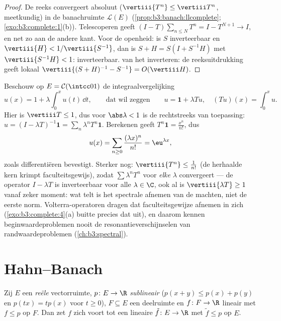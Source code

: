 \begin{proof}
De reeks convergeert absoluut ($\vertiii{T^n} \leq \vertiii T^n$,
meetkundig) in de banachruimte $\mathcal L(E)$
(\cref{prop:b3:banach:llcomplete};
\cref{exo:b3:complete:1}(b)). Telescoperen geeft $(I -
T)\sum_{n \leq N}T^n = I - T^{N+1} \to I$, en net zo aan de andere
kant. Voor de openheid: is $S$ inverteerbaar en $\vertiii{H} <
1/\vertiii{S^{-1}}$, dan is $S + H = S(I + S^{-1}H)$ met
$\vertiii{S^{-1}H} < 1$: inverteerbaar.  van het
inverteren: de reeksuitdrukking geeft lokaal
$\vertiii{(S+H)^{-1} - S^{-1}} = O(\vertiii H)$.
\end{proof}

\begin{example}
\label{ex:b3:banach:volterraexample}
Beschouw op $E = \mathcal C(\intcc01)$ de integraalvergelijking
\[
u(x) = 1 + \lambda\int_0^xu(t)\,\dd t,
\qquad\text{dat wil zeggen}\qquad u = \mathbf 1 + \lambda Tu,
\quad (Tu)(x) = \int_0^xu .
\]
Hier is $\vertiii T \leq 1$, dus voor $\abs\lambda < 1$ is de
 rechtstreeks van toepassing: $u = (I - \lambda
T)^{-1}\mathbf 1 = \sum_n\lambda^nT^n\mathbf 1$. Berekenen geeft
$T^n\mathbf 1 = \frac{x^n}{n!}$, dus
\[
u(x) = \sum_{n\geq0}\frac{(\lambda x)^n}{n!} =
\eu^{\lambda x} ,
\]
zoals differentiëren bevestigt. Sterker nog: $\vertiii{T^n} \leq
\frac1{n!}$ (de herhaalde kern krimpt faculteitsgewijs), zodat
$\sum\lambda^nT^n$ voor \emph{elke} $\lambda$ convergeert --- de
operator $I - \lambda T$ is inverteerbaar voor alle $\lambda \in
\C$, ook al is $\vertiii{\lambda T} \geq 1$ vanaf zeker moment:
wat telt is het spectrale afnemen van de machten, niet de eerste
norm. Volterra-operatoren dragen dat faculteitsgewijze afnemen in
zich (\cref{exo:b3:complete:4}(a) buitte precies dat uit), en
daarom kennen beginwaardeproblemen nooit de
resonantieverschijnselen van randwaardeproblemen
(\cref{ch:b3:spectral}).
\end{example}

\section{Hahn--Banach}

\begin{theorem}
\label{thm:b3:banach:hahnbanach}
Zij $E$ een \emph{reële} vectorruimte, $p \colon E \to \R$
\emph{sublineair} ($p(x + y) \leq p(x) + p(y)$ en $p(tx) = tp(x)$
voor $t \geq 0$), $F \subseteq E$ een deelruimte en $f \colon F
\to \R$ lineair met $f \leq p$ op $F$. Dan zet $f$ zich voort tot
een lineaire $\tilde f \colon E \to \R$ met $\tilde f \leq p$ op
$E$.
\end{theorem}

